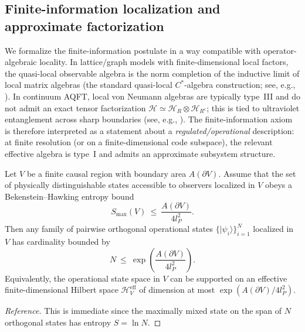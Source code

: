 \subsection{Finite-information localization and approximate factorization}
We formalize the finite-information postulate in a way compatible with operator-algebraic locality. In lattice/graph models with finite-dimensional local factors, the quasi-local observable algebra is the norm completion of the inductive limit of local matrix algebras (the standard quasi-local $C^\ast$-algebra construction; see, e.g., \cite{BratteliRobinson1987OAQSM1}). In continuum AQFT, local von Neumann algebras are typically type~III and do not admit an exact tensor factorization $\mathcal{H}\simeq\mathcal{H}_R\otimes\mathcal{H}_{R^c}$; this is tied to ultraviolet entanglement across sharp boundaries (see, e.g., \cite{Haag1996}). The finite-information axiom is therefore interpreted as a statement about a \emph{regulated/operational} description: at finite resolution (or on a finite-dimensional code subspace), the relevant effective algebra is type~I and admits an approximate subsystem structure.\par

\begin{theorem}
\label{thm:finite_information_dimension}
Let $V$ be a finite causal region with boundary area $A(\partial V)$.
Assume that the set of physically distinguishable states accessible to observers localized in $V$ obeys a Bekenstein--Hawking entropy bound \cite{bekenstein1973black,hawking1975particle}
\begin{equation}
    S_{\max}(V)\ \le\ \frac{A(\partial V)}{4 l_P^2}.
\end{equation}
Then any family of pairwise orthogonal operational states $\{|\psi_i\rangle\}_{i=1}^N$ localized in $V$ has cardinality bounded by
\begin{equation}
    N\ \le\ \exp\!\left(\frac{A(\partial V)}{4 l_P^2}\right).
\end{equation}
Equivalently, the operational state space in $V$ can be supported on an effective finite-dimensional Hilbert space $\mathcal{H}^{\mathrm{eff}}_V$ of dimension at most $\exp(A(\partial V)/4l_P^2)$.
\end{theorem}
\begin{proof}[Reference]
This is immediate since the maximally mixed state on the span of $N$ orthogonal states has entropy $S=\ln N$.
\end{proof}

